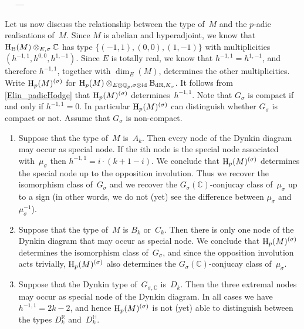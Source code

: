 \documentclass[10pt,twoside,leqno]{article}
\renewcommand{\paragraph}[1]{\par\bigskip\refstepcounter{subsection}%
 {\normalfont\normalsize\scshape\noindent\thesubsection%
 \ifthenelse{\equal{#1}{}}%
 {}%
 {\ \textls{#1.}}%
 \ ---}%
}
\numberwithin{equation}{subsection}
\newcommand{\id}{\textnormal{id}}
\newcommand{\QQ}{\mathbb{Q}}
\newcommand{\QQp}{\QQ_{p}}
\newcommand{\RR}{\mathbb{R}}
\newcommand{\CC}{\mathbb{C}}
\newcommand{\HQ}{\mathbb{H}}
\newcommand{\BdR}[1]{\textnormal{B}_{\dR,#1}}
\newcommand{\dR}{\textnormal{dR}}
\newcommand{\HH}{\textnormal{H}}
\newcommand{\Hp}{\HH_{p}}
\newcommand{\HB}{\HH_{\textnormal{B}}}
\begin{document}
\paragraph{}
Let us now discuss the relationship between the type of~\(M\)
and the \(p\)-adic realisations of~\(M\).
Since \(M\) is abelian and hyperadjoint,
we know that \(\HB(M) \otimes_{E,\sigma} \CC\)
has type \(\{(-1,1), (0,0), (1,-1)\}\) with multiplicities
\((h^{-1,1},h^{0,0},h^{1,-1})\).
Since \(E\) is totally real, we know that \(h^{-1,1} = h^{1,-1}\),
and therefore \(h^{-1,1}\), together with \(\dim_{E}(M)\),
determines the other multiplicities.
Write \(\Hp(M)^{(\sigma)}\) for
\(\Hp(M) \otimes_{E \otimes \QQp, \sigma \otimes \id} \BdR{K_{v}}\).
It follows from \cref{Elin_padicHodge}
that \(\Hp(M)^{(\sigma)}\) determines~\(h^{-1,1}\).
Note that \(G_{\sigma}\) is compact if and only if \(h^{-1,1} = 0\).
In particular \(\Hp(M)^{(\sigma)}\) can distinguish whether
\(G_{\sigma}\) is compact or not.
Assume that \(G_{\sigma}\) is non-compact.
\begin{enumerate}
 \item Suppose that the type of~\(M\) is~\(A_{k}\).
  Then every node of the Dynkin diagram may occur as special node.
  If the \(i\)th node is the special node associated with~\(\mu_{\sigma}\)
  then \(h^{-1,1} = i\cdot(k+1-i)\).
  We conclude that \(\Hp(M)^{(\sigma)}\)
  determines the special node up to the opposition involution.
  Thus we recover the isomorphism class of~\(G_{\sigma}\)
  and we recover the \(G_{\sigma}(\CC)\)-conjucay class of~\(\mu_{\sigma}\)
  up to a sign (in other words, we do not (yet)
  see the difference between \(\mu_{\sigma}\) and~\(\mu_{\sigma}^{-1}\)).
 \item Suppose that the type of~\(M\) is \(B_{k}\) or~\(C_{k}\).
  Then there is only one node of the Dynkin diagram
  that may occur as special node.
  We conclude that \(\Hp(M)^{(\sigma)}\) determines
  the isomorphism class of~\(G_{\sigma}\),
  and since the opposition involution acts trivially,
  \(\Hp(M)^{(\sigma)}\) also determines
  the \(G_{\sigma}(\CC)\)-conjucay class of~\(\mu_{\sigma}\).
 \item Suppose that the Dynkin type of~\(G_{\sigma,\CC}\) is~\(D_{k}\).
  Then the three extremal nodes may occur as special node of the Dynkin diagram.
  In all cases we have \(h^{-1,1} = 2k-2\),
  and hence \(\Hp(M)^{(\sigma)}\) is not (yet) able to distinguish
  between the types \(D_{k}^{\RR}\) and~\(D_{k}^{\HQ}\).
\end{enumerate}
\end{document}
